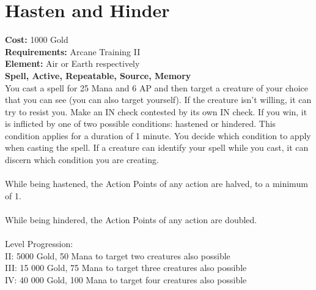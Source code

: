 \section{Hasten and Hinder}
\textbf{Cost:} 1000 Gold\\
\textbf{Requirements:} Arcane Training II\\
\textbf{Element:} Air or Earth respectively\\
\textbf{Spell, Active, Repeatable, Source, Memory}\\
You cast a spell for 25 Mana and 6 AP and then target a creature of your choice that you can see (you can also target yourself). If the creature isn’t willing, it can try to resist you. Make an IN check contested by its own IN check. If you win, it is inflicted by one of two possible conditions: hastened or hindered. This condition applies for a duration of 1 minute. You decide which condition to apply when casting the spell. If a creature can identify your spell while you cast, it can discern which condition you are creating.\\
\\
While being hastened, the Action Points of any action are halved, to a minimum of 1.\\
\\
While being hindered, the Action Points of any action are doubled.\\
\\
Level Progression:\\
II: 5000 Gold, 50 Mana to target two creatures also possible\\
III: 15 000 Gold, 75 Mana to target three creatures also possible\\
IV: 40 000 Gold, 100 Mana to target four creatures also possible \\